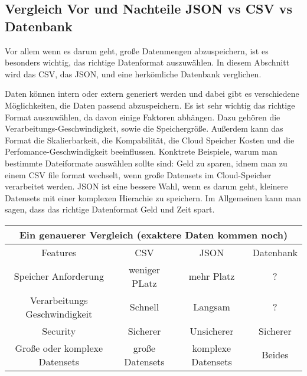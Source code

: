 \subsection{Vergleich Vor und Nachteile JSON vs CSV vs Datenbank}
Vor allem wenn es darum geht, große Datenmengen abzuspeichern, ist es besonders wichtig, das richtige Datenformat auszuwählen. In diesem Abschnitt wird das CSV, das JSON, und eine herkömliche Datenbank verglichen. 

Daten können intern oder extern generiert werden und dabei gibt es verschiedene Möglichkeiten, die Daten passend abzuspeichern. Es ist sehr wichtig das richtige Format auszuwählen, da davon einige Faktoren abhängen. Dazu gehören die Verarbeitungs-Geschwindigkeit, sowie die Speichergröße. 
Außerdem kann das Format die Skalierbarkeit, die Kompabilität, die Cloud Speicher Kosten und die Perfomance-Geschwindigkeit beeinflussen. 
Konktrete Beispiele, warum man bestimmte Dateiformate auswählen sollte sind: Geld zu sparen, idnem man zu einem CSV file format wechselt, wenn große Datensets im Cloud-Speicher verarbeitet werden. JSON ist eine bessere Wahl, wenn es darum geht, kleinere Datensets mit einer komplexen Hierachie zu speichern. 
Im Allgemeinen kann man sagen, dass das richtige Datenformat Geld und Zeit spart.  

\begin{center}
    \begin{tabular}{ |c|c|c|c| } 
     \hline
     \multicolumn{4}{|c|}{Ein genauerer Vergleich (exaktere Daten kommen noch) } \\
     \hline
     \hline
     Features & CSV & JSON & Datenbank \\ 
     \hline 
     \hline
     Speicher Anforderung & weniger PLatz & mehr Platz & ? \\ 
     \hline
     Verarbeitungs Geschwindigkeit & Schnell & Langsam & ? \\ 
     \hline
     Security & Sicherer & Unsicherer & Sicherer \\ 
     \hline
     Große oder komplexe Datensets & große Datensets & komplexe Datensets & Beides \\ 
     \hline
    \end{tabular}
    \end{center}

